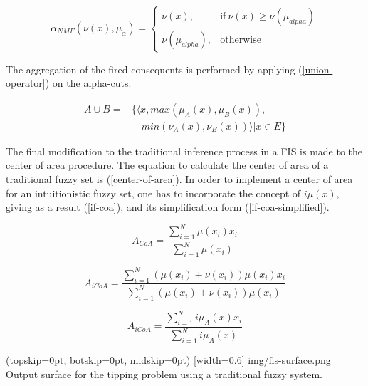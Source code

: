 ﻿\documentclass{ieeeaccess}
\begin{document}
\begin{equation}
  \label{nmf-alpha-cut}
  \alpha_{NMF}(\nu (x),\mu_{\alpha}) =
  \begin{cases}
    \nu (x), & \text{if}\ \nu (x) \geq \nu (\mu_{alpha})  \\
    \nu (\mu_{alpha}), & \text{otherwise}
  \end{cases}
\end{equation}

The aggregation of the fired consequents is performed by applying
(\ref{union-operator}) on the alpha-cuts.

\begin{equation}
  \label{union-operator}
  \begin{aligned}
    A \cup B  = &\{ \langle x, max(\mu_{A} (x), \mu_{B} (x)),\\
    &\quad min(\nu_{A} (x), \nu_{B} (x)) \rangle | x \in E \}
\end{aligned}
\end{equation}

The final modification to the traditional inference process in a FIS is made to
the center of area procedure. The equation to calculate the center of area of a traditional fuzzy set is 
(\ref{center-of-area}). In order to implement a center of area for an intuitionistic fuzzy set, 
one has to incorporate the concept of $i\mu(x)$, giving as a result (\ref{if-coa}), 
and its simplification form (\ref{if-coa-simplified}).

\begin{equation}
  \label{center-of-area}
  A_{CoA} = \dfrac{\sum_{i=1}^{N} \mu(x_{i})
    x_{i}}{\sum_{i=1}^{N} \mu(x_{i})}
\end{equation}

\begin{equation}
  \label{if-coa}
  A_{iCoA} = \dfrac{\sum_{i=1}^{N} (\mu(x_{i}) + \nu(x_{i})) \mu(x_{i})
    x_{i}}{\sum_{i=1}^{N} (\mu(x_{i}) + \nu(x_{i})) \mu(x_{i})}
\end{equation}

\begin{equation}
  \label{if-coa-simplified}
  A_{iCoA} = \dfrac{\sum_{i=1}^{N} i\mu_{A}(x) x_{i}}{\sum_{i=1}^{N}
    i\mu_{A}(x)}
\end{equation}

\Figure[](topskip=0pt, botskip=0pt, midskip=0pt)
[width=0.6\linewidth]
{img/fis-surface.png}
{Output surface for the tipping problem using a traditional fuzzy system.
  \label{figure:tipping-output-surface}}
\end{document}
